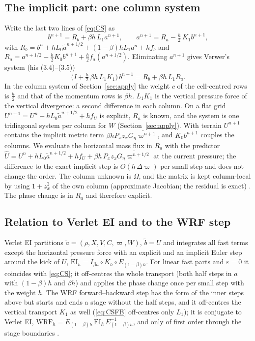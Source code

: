 \documentclass[11pt,a4paper]{article}
\newcommand{\pv}{\varpi}      %
\begin{document}
\subsection{The implicit part: one column system}\label{sec:Isolve}
Write the last two lines of \eqref{eq:CS} as
\[
b^{n+1}=R_b+\beta h\,L_1a^{n+1},\qquad a^{n+1}=R_a-\tfrac h2\,K_1b^{n+1},
\]
with $R_b=b^n+hL_0\tilde a^{n+1/2}+(1-\beta)hL_1a^n+hf_b$ and $R_a=a^{n+1/2}-\tfrac h2K_0b^{n+1}+\tfrac h2f_a(a^{n+1/2})$.
Eliminating $a^{n+1}$ gives Verwer's system (his (3.4)--(3.5))
\[
\big(I+\tfrac h2\,\beta h\,L_1K_1\big)\,b^{n+1}=R_b+\beta h\,L_1R_a .
\]
In the column system of Section~\ref{sec:apply} the weight $c$ of the cell-centred rows is $\tfrac h2$ and that of the
momentum rows is $\beta h$.
$L_1K_1$ is the vertical pressure force of the vertical divergence: a second difference in each
column. On a flat grid $U^{n+1}=U^n+hL_0\tilde a^{n+1/2}+hf_U$ is explicit, $R_a$ is known, and the system is
one tridiagonal system per column for $W$ (Section~\ref{sec:apply}). With terrain $U^{n+1}$ contains the
implicit metric term $\beta hP_xz_x\overline{G_\eta\pv^{n+1}}$, and $K_0b^{n+1}$ couples the columns. We evaluate the
horizontal mass flux in $R_a$ with the predictor $\hat U=U^n+hL_0\tilde a^{n+1/2}+hf_U+\beta h\,P_xz_x\overline{G_\eta\pv^{n+1/2}}$ at the
current pressure; the difference to the exact implicit step is $O(h\,\Delta\pv)$ per small step and does
not change the order. The column unknown is $\Omega$, and the matrix is kept column-local by using $1+z_x^2$
of the own column (approximate Jacobian; the residual is exact) \cite{verletei}. The phase change is in
$R_a$ and therefore explicit.

\subsection{Relation to Verlet EI and to the WRF step}\label{sec:conj}
Verlet EI \cite{imex,verletei} partitions $\tilde a=(\rho,X,V,C,\pv,W)$, $\tilde b=U$ and integrates all fast terms except the
horizontal pressure force with an explicit and an implicit Euler step around the kick of $U$,
$\text{EI}_h=I_{\beta h}\circ K_h\circ E_{(1-\beta)h}$. For linear fast parts and $\varepsilon=0$ it coincides with \eqref{eq:CS}; it
off-centres the whole transport (both half steps in $a$ with $(1-\beta)h$ and $\beta h$) and applies the phase change
once per small step with the weight $h$. The WRF forward--backward step has the form of the inner steps above
but starts and ends a stage without the half steps, and it off-centres the vertical transport $K_1$ as well
(\eqref{eq:CSFB} off-centres only $L_1$); it is conjugate to Verlet EI,
$\text{WRF}_h=E_{(1-\beta)h}\,\text{EI}_h\,E_{(1-\beta)h}^{-1}$, and only of first order through the stage boundaries \cite{verletei}.
\end{document}
